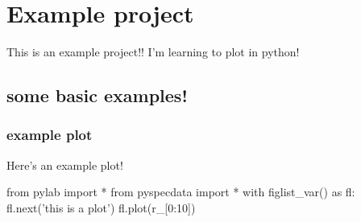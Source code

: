 \section{Example project}
This is an example project!!
I'm learning to plot in python!
\subsection{some basic examples!}
\subsubsection{example plot}\label{sec:examplePlot1}
Here's an example plot!
\par
\begin{python}[on]
from pylab import *
from pyspecdata import *
with figlist_var() as fl:
    fl.next('this is a plot')
    fl.plot(r_[0:10])
\end{python}
\par
